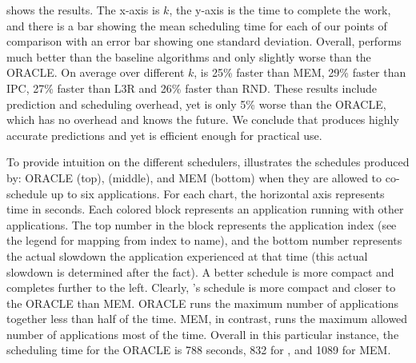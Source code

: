  shows the results. The x-axis is
$k$, the y-axis is the time to complete the work, and there is a bar
showing the mean scheduling time for each of our points of comparison
with an error bar showing one standard deviation.
Overall, \SYSTEM{} performs much better than the baseline algorithms
and only slightly worse than the ORACLE. On average over different
$k$, \SYSTEM{} is 25\% faster than MEM, 29\% faster than IPC, 27\%
faster than L3R and 26\% faster than RND.  These results include
prediction and scheduling overhead, yet \SYSTEM{} is only 5\% worse
than the ORACLE, which has no overhead and knows the future.  We
conclude that \SYSTEM{} produces highly accurate predictions and yet
is efficient enough for practical use.


To provide intuition on the different schedulers,
 illustrates the schedules produced by: ORACLE
(top), \SYSTEM{} (middle), and MEM (bottom) when they are allowed to
co-schedule up to six applications.  For each chart, the horizontal
axis represents time in seconds. Each colored block represents an
application running with other applications. The top number in the
block represents the application index (see the legend for mapping
from index to name), and the bottom number represents the actual
slowdown the application experienced at that time (this actual
slowdown is determined after the fact).  A better schedule is more
compact and completes further to the left.  Clearly, \SYSTEM{}'s
schedule is more compact and closer to the ORACLE than MEM.  ORACLE
runs the maximum number of applications together less than half of the
time.  MEM, in contrast, runs the maximum allowed number of
applications most of the time. Overall in this particular instance,
the scheduling time for the ORACLE is 788 seconds, 832 for \SYSTEM{},
and 1089 for MEM.




